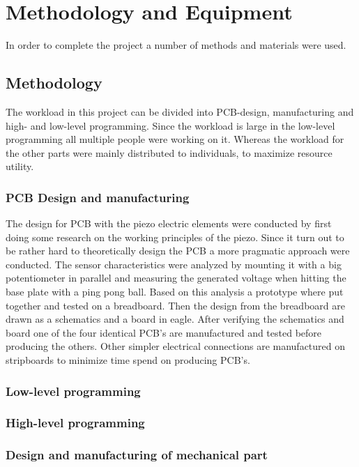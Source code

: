 \chapter{Methodology and Equipment}
\label{chap:methodology}

In order to complete the project a number of methods and materials were used.
\section{Methodology}
\label{sec:methodology}
The workload in this project can be divided into PCB-design, manufacturing and high- and low-level programming. Since the workload is large in the low-level programming all multiple people were working on it. Whereas the workload for the other parts were mainly distributed to individuals, to maximize resource utility.   

\subsection{PCB Design and manufacturing}
The design for PCB with the piezo electric elements were conducted by first doing some research on the working principles of the piezo. Since it turn out to be rather hard to theoretically design the PCB  a more pragmatic approach were conducted. 
The sensor characteristics were analyzed by mounting it with a big potentiometer in parallel and measuring the generated voltage when hitting the base plate with a ping pong ball.
Based on this analysis a prototype where put together and tested on a breadboard. 
Then the design from the breadboard are drawn as a schematics and a board in eagle. 
After verifying the schematics and board one of the four identical PCB's are manufactured and tested before producing the others.
Other simpler electrical connections are manufactured on stripboards to minimize time spend on producing PCB's.

\subsection{Low-level programming}


\subsection{High-level programming}


\subsection{Design and manufacturing of mechanical part}
